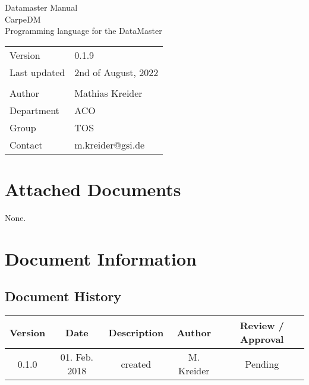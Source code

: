 \documentclass[12pt,a4paper]{report}
\makeatletter
\newcommand{\AppendixA}{dm_memmap}
\newcommand{\AppendixB}{dm_language}
\newcommand{\AppendixC}{dm_troubleshooting}
\newcommand{\DocAuthor}{Mathias Kreider}
\newcommand{\DocContact}{m.kreider@gsi.de}
\newcommand{\DocTitle}{CarpeDM\\Programming language for the DataMaster}
\newcommand{\DocName}{Datamaster Manual}
\newcommand{\DocRev}{2nd of August, 2022} %
\newcommand{\DocVer}{0.1.9}
\newcommand{\DocGroup}{TOS}
\newcommand{\DocDept}{ACO}
\newcommand{\DocHist}{
0.1.0 & 01. Feb. 2018 & created & M. Kreider & Pending\\
\hline
}
\makeatother
\begin{document}
\begin{titlepage}
\begin{center}
\vspace{2em}

\Huge{\DocName}\\[2cm]
\Large{\DocTitle}\\[2cm]

\begin{large}
\begin{tabularx}{\textwidth}{Xl}
Version & \DocVer\\
Last updated & \DocRev\\
\vspace{1.5cm}\\
Author & \DocAuthor\\
Department & \DocDept\\
Group & \DocGroup\\
Contact & \DocContact
\end{tabularx}%
\end{large}

\vfill

\end{center}
\end{titlepage}



%
%
%
\pagestyle{plain} %
\tableofcontents

\glsunsetall
\setcounter{chapter}{0}












\appendix
\renewcommand{\thechapter}{\Roman{chapter}}
\chapter{Attached Documents}
None.
\begingroup
\raggedright
\sloppy
\printbibliography[heading=bibnumbered]
\endgroup
\chapter{Document Information}
\section{Document History}
\begin{table}[H]
\begin{tabular}{ | c | c | c | c | c |}
\hline
\textbf{Version} & \textbf{Date} & \textbf{Description} & \textbf{Author} & \textbf{Review / Approval} \\
\hline
\DocHist
\hline
\end{tabular}
\end{table}
\end{document}

